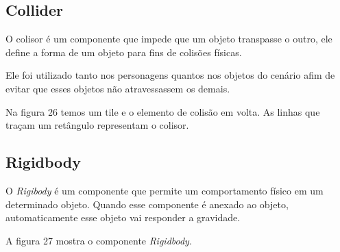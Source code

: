 \subsection{Collider}
O colisor é um componente que impede que um objeto transpasse o outro, ele define a forma de um objeto para fins de colisões físicas.

Ele foi utilizado tanto nos personagens quantos nos objetos do cenário afim de evitar que esses objetos não atravessassem os demais.

Na figura 26 temos um tile e o elemento de colisão em volta. As linhas que traçam um retângulo representam o colisor.

	\begin{figure}[h!]
		\centering
	\end{figure}



\subsection{Rigidbody}
O \textit{Rigibody} é um componente que permite um comportamento físico em um determinado objeto. Quando esse componente é anexado ao objeto, automaticamente esse objeto vai responder a gravidade.

A figura 27 mostra o componente \textit{Rigidbody}.
	
	\begin{figure}[h!]
		\centering
	\end{figure}


